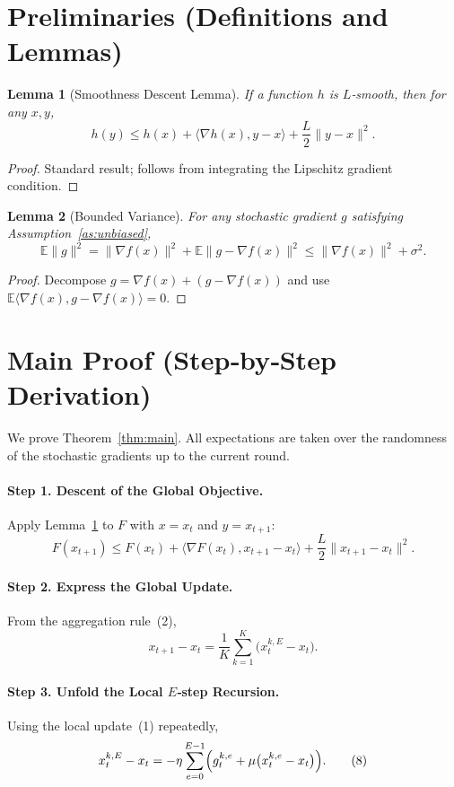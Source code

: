 \documentclass{article}
\newtheorem{lemma}{Lemma}
\newcommand{\E}{\mathbb{E}}
\begin{document}
\section*{Preliminaries (Definitions and Lemmas)}
\begin{lemma}[Smoothness Descent Lemma]\label{lem:smooth}
If a function $h$ is $L$‑smooth, then for any $x,y$,
\[
h(y)\le h(x)+\langle\nabla h(x),y-x\rangle+\frac{L}{2}\|y-x\|^{2}.
\tag{4}
\]
\end{lemma}
\begin{proof}
Standard result; follows from integrating the Lipschitz gradient condition.
\end{proof}
\begin{lemma}[Bounded Variance]\label{lem:var}
For any stochastic gradient $g$ satisfying Assumption~\ref{as:unbiased},
\[
\E\|g\|^{2}
= \|\nabla f(x)\|^{2}+\E\|g-\nabla f(x)\|^{2}
\le \|\nabla f(x)\|^{2}+\sigma^{2}.
\tag{5}
\]
\end{lemma}
\begin{proof}
Decompose $g=\nabla f(x)+(g-\nabla f(x))$ and use $\E\langle\nabla f(x),g-\nabla f(x)\rangle=0$.
\end{proof}

\section*{Main Proof (Step‑by‑Step Derivation)}
We prove Theorem~\ref{thm:main}.  
All expectations are taken over the randomness of the stochastic gradients up to the current round.

\paragraph{Step 1. Descent of the Global Objective.}
Apply Lemma~\ref{lem:smooth} to $F$ with $x=x_t$ and $y=x_{t+1}$:
\[
F(x_{t+1})\le F(x_t)+\big\langle\nabla F(x_t),x_{t+1}-x_t\big\rangle
+\frac{L}{2}\|x_{t+1}-x_t\|^{2}.
\tag{6}\label{eq:descent}
\]

\paragraph{Step 2. Express the Global Update.}
From the aggregation rule~(2),
\[
x_{t+1}-x_t
=\frac1K\sum_{k=1}^{K}\bigl(x_{t}^{k,E}-x_t\bigr).
\tag{7}
\]

\paragraph{Step 3. Unfold the Local $E$‑step Recursion.}
Using the local update~(1) repeatedly,
\[
x_{t}^{k,E}-x_t
= -\eta\sum_{e=0}^{E-1}\Bigl(g_{t}^{k,e}
+\mu\bigl(x_{t}^{k,e}-x_t\bigr)\Bigr).
\tag{8}\label{eq:local-drift}
\]
\end{document}

